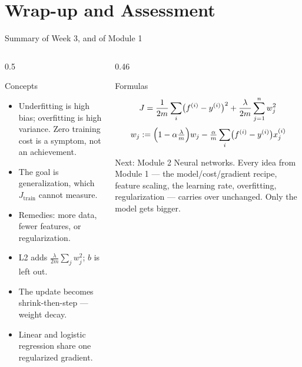 \documentclass[aspectratio=169,10pt]{beamer}
\begin{document}
\section{Wrap-up and Assessment}

\begin{frame}{Summary of Week 3, and of Module 1}
  \footnotesize
  \begin{columns}[T,onlytextwidth]
    \begin{column}{0.5\textwidth}
      \begin{block}{Concepts}
        \begin{itemize}
          \item Underfitting is high bias; overfitting is high variance. Zero training cost
                is a symptom, not an achievement.
          \item The goal is generalization, which $J_{\text{train}}$ cannot measure.
          \item Remedies: more data, fewer features, or regularization.
          \item L2 adds $\frac{\lambda}{2m}\sum_j w_j^2$; $b$ is left out.
          \item The update becomes shrink-then-step --- weight decay.
          \item Linear and logistic regression share one regularized gradient.
        \end{itemize}
      \end{block}
    \end{column}
    \begin{column}{0.46\textwidth}
      \begin{block}{Formulas}
        \[ J = \frac{1}{2m}\sum_i\bigl(f^{(i)}-y^{(i)}\bigr)^2 + \frac{\lambda}{2m}\sum_{j=1}^{n}w_j^2 \]
        \[ w_j := \Bigl(1-\alpha\tfrac{\lambda}{m}\Bigr)w_j - \tfrac{\alpha}{m}\sum_i\bigl(f^{(i)}-y^{(i)}\bigr)x^{(i)}_{j} \]
      \end{block}
      \begin{block}{Next: Module 2}
        \footnotesize
        Neural networks. Every idea from Module 1 --- the model/cost/gradient recipe, feature
        scaling, the learning rate, overfitting, regularization --- carries over unchanged.
        Only the model gets bigger.
      \end{block}
    \end{column}
  \end{columns}
\end{frame}
\end{document}
